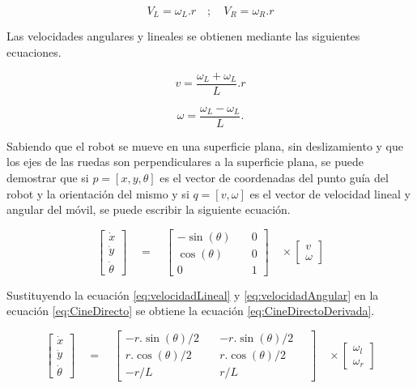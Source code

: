 \begin{equation}
{ V }_{ L }={ \omega  }_{ L }.r\quad ;\quad { V }_{ R }={ \omega  }_{ R }.r
\end{equation}


Las velocidades angulares y lineales se obtienen mediante las siguientes ecuaciones.

\begin{equation}
\label{eq:velocidadLineal}
v=\frac { { \omega  }_{ L }+{ \omega  }_{ L } }{ L } .r
\end{equation}


\begin{equation}
\label{eq:velocidadAngular}
\omega =\frac { { \omega  }_{ L }-{ \omega  }_{ L } }{ L } .
\end{equation}

Sabiendo que el robot se mueve en una superficie plana, sin deslizamiento y que los ejes de las ruedas son perpendiculares a la superficie plana, se puede demostrar que si
$p = [x, y, \theta ]$ es el vector de coordenadas del punto guía del robot y la orientación del mismo y si $q= [ v, \omega]$ es el vector de velocidad lineal y angular del móvil, se puede escribir la siguiente ecuación.

\begin{equation}
\label{eq:CineDirecto}
\begin{bmatrix} \dot { x }  \\ \dot { y }  \\ \dot { \theta  }  \end{bmatrix}\quad =\quad \begin{bmatrix} -\sin { (\theta )\quad  }  & 0 \\ \cos { (\theta ) }  & 0 \\ 0 & 1 \end{bmatrix}\quad \times \begin{bmatrix} v \\ { \omega  } \end{bmatrix}
\end{equation}

Sustituyendo la ecuación \ref{eq:velocidadLineal} y \ref{eq:velocidadAngular} en la ecuación \ref{eq:CineDirecto} se obtiene la ecuación \ref{eq:CineDirectoDerivada}.

\begin{equation}
\label{eq:CineDirectoDerivada}
\begin{bmatrix} \dot { x }  \\ \dot { y }  \\ \dot { \theta  }  \end{bmatrix}\quad =\quad \begin{bmatrix} -r.\sin { (\theta )/2\quad  }  & -r.\sin { (\theta )/2\quad  }  \\ r.\cos { (\theta )/2 }  & r.\cos { (\theta )/2 }  \\ -r/L & r/L \end{bmatrix}\quad \times \begin{bmatrix} { \omega  }_{ l } \\ { \omega  }_{ r } \end{bmatrix}
\end{equation}


